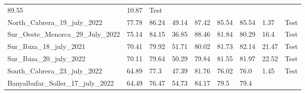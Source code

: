 \begin{table}[H]
{\begin{tabular}{lllllllll}
            89.55
                                                   & 10.87               &
            {\color[HTML]{fc8d62} Test}
            \\
            North\_Cabrera\_19\_july\_2022         & 77.78               &
            86.24
                                                   & 49.14               &
            87.42
                                                   & 85.54               &
            85.54
                                                   & 1.37                &
            {\color[HTML]{fc8d62} Test}
            \\
            Sur\_Oeste\_Menorca\_29\_July\_2022    & 75.14               &
            84.15
                                                   & 36.85               &
            88.46
                                                   & 81.84               &
            80.29
                                                   & 16.4                &
            {\color[HTML]{fc8d62} Test}
            \\
            Sur\_Ibiza\_18\_july\_2021             & 70.41               &
            79.92
                                                   & 51.71               &
            80.02
                                                   & 81.73               &
            82.14
                                                   & 21.47               &
            {\color[HTML]{fc8d62} Test}
            \\
            Sur\_Ibiza\_20\_july\_2022             & 70.11               &
            79.64
                                                   & 50.29               &
            79.84
                                                   & 81.55               &
            81.97
                                                   & 22.52               &
            {\color[HTML]{fc8d62} Test}
            \\
            South\_Cabrera\_23\_july\_2022         & 64.89               & 77.3
                                                   & 47.39               &
            81.76
                                                   & 76.02               & 76.0
                                                   & 1.45                &
            {\color[HTML]{fc8d62} Test}
            \\
            Banyalbufar\_Soller\_17\_july\_2022    & 64.49               &
            76.47
                                                   & 54.73               &
            84.17
                                                   & 79.5                & 79.4

\end{tabular}}
\end{table}
